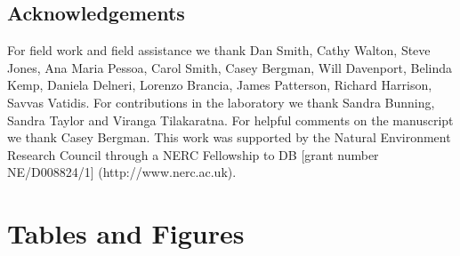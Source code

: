 \documentclass[12pt]{article}
\begin{document}
\begin{linenumbers}
\clearpage




\section*{Acknowledgements}
\label{Acknowledgements}

For field work and field assistance we thank Dan Smith, Cathy Walton, Steve Jones, Ana Maria Pessoa, Carol Smith, Casey Bergman, Will Davenport, Belinda Kemp, Daniela Delneri, Lorenzo Brancia, James Patterson, Richard Harrison, Savvas Vatidis. For contributions in the laboratory we thank Sandra Bunning, Sandra Taylor and Viranga Tilakaratna. For helpful comments on the manuscript we thank Casey Bergman. This work was supported by the Natural Environment Research Council through a NERC Fellowship to DB [grant number NE/D008824/1] (http://www.nerc.ac.uk). 

\clearpage



{\footnotesize \linespread{1}
}
\end{linenumbers}
\clearpage







\section*{Tables and Figures}
\end{document}
